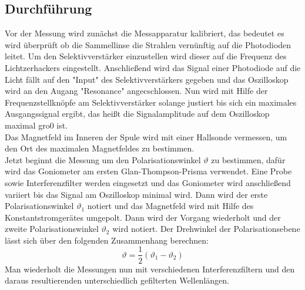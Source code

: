 \subsection{Durchführung}
\label{sec:durch}
Vor der Messung wird zunächst die Messapparatur kalibriert, das bedeutet es wird überprüft ob die Sammellinse die Strahlen vernünftig auf die Photodioden leitet. Um den Selektivverstärker einzustellen wird dieser auf die Frequenz
des Lichtzerhackers eingestellt. Anschließend wird das Signal einer Photodiode auf die Licht fällt auf den "Input" des Selektivverstärkers gegeben und das Oszilloskop wird an den Augang "Resonance" angecschlossen. Nun wird mit Hilfe der
Frequenzstellknöpfe am Selektivverstärker solange justiert bis sich ein maximales Ausgangssignal ergibt, das heißt die Signalamplitude auf dem Oszilloskop maximal gro0 ist. \\
Das Magnetfeld im Inneren der Spule wird mit einer Hallsonde vermessen, um den Ort des maximalen Magnetfeldes zu bestimmen. \\
Jetzt beginnt die Messung um den Polarisationswinkel $\vartheta$ zu bestimmen, dafür wird das Goniometer am ersten Glan-Thompson-Prisma verwendet.
 Eine Probe sowie Interferenzfilter werden eingesetzt und das Goniometer wird anschließend variiert bis das Signal am Oszilloskop minimal wird.
  Dann wird der erste Polarisationswinkel $\vartheta_\mathrm{1}$ notiert und das Magnetfeld wird mit Hilfe des Konstantstromgerätes umgepolt. Dann wird der Vorgang wiederholt und der zweite
Polarisationswinkel $\vartheta_\mathrm{2}$ wird notiert. Der Drehwinkel der Polarisationsebene lässt sich über den folgenden Zusammenhang berechnen:
\begin{equation}
  \label{eqn:rotawinkel}
  \vartheta=\dfrac{1}{2}(\vartheta_\mathrm{1}-\vartheta_\mathrm{2})
\end{equation}
Man wiederholt die Messungen nun mit verschiedenen Interferenzfiltern und den daraus resultierenden unterschiedlich gefilterten Wellenlängen.
